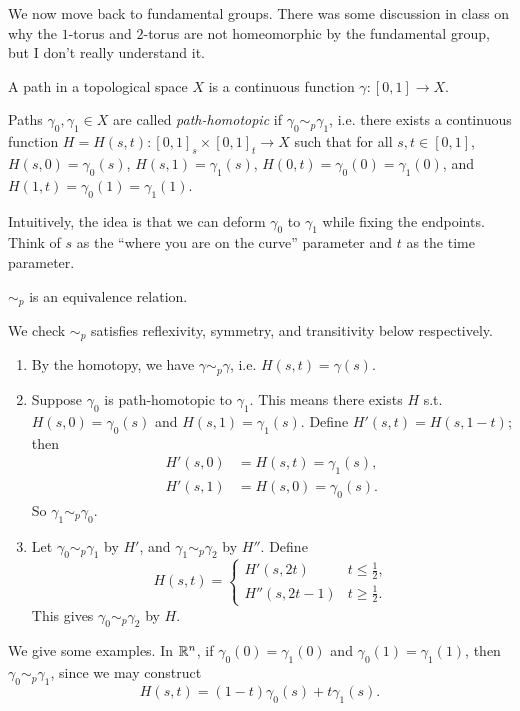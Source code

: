 \noindent We now move back to fundamental groups. There was some discussion in class on why the $1$-torus and $2$-torus are not homeomorphic by the fundamental group, but I don't really understand it.
\begin{definition}
    A path in a topological space $X$ is a continuous function $\gamma : [0, 1] \to X$.
\end{definition}
\begin{definition}
    Paths $\gamma_0, \gamma_1 \in X$ are called \textit{path-homotopic} if $\gamma_0 \sim_p \gamma_1$, i.e. there exists a continuous function $H = H(s, t) : [0, 1]_s \times [0, 1]_t \to X$ such that for all $s, t \in [0, 1]$, $H(s, 0) = \gamma_0(s)$, $H(s, 1) = \gamma_1(s)$, $H(0, t) = \gamma_0(0) = \gamma_1(0)$, and $H(1, t) = \gamma_0(1) = \gamma_1(1)$.
\end{definition}
\noindent Intuitively, the idea is that we can deform $\gamma_0$ to $\gamma_1$ while fixing the endpoints. Think of $s$ as the ``where you are on the curve'' parameter and $t$ as the time parameter.
\begin{simpleclaim}
    $\sim_p$ is an equivalence relation.
\end{simpleclaim}
\noindent We check $\sim_p$ satisfies reflexivity, symmetry, and transitivity below respectively.
\begin{enumerate}[label=(\alph*)]
    \item By the homotopy, we have $\gamma \sim_p \gamma$, i.e. $H(s, t) = \gamma(s)$.
    \item Suppose $\gamma_0$ is path-homotopic to $\gamma_1$. This means there exists $H$ s.t. $H(s, 0) = \gamma_0(s)$ and $H(s, 1) = \gamma_1(s)$. Define $H'(s, t) = H(s, 1-t)$; then
    \begin{align*}
        H'(s, 0) &= H(s, t) = \gamma_1(s), \\
        H'(s, 1) &= H(s, 0) = \gamma_0(s).
    \end{align*}
    So $\gamma_1 \sim_p \gamma_0$.
    \item Let $\gamma_0 \sim_p \gamma_1$ by $H'$, and $\gamma_1 \sim_p \gamma_2$ by $H''$. Define
    \[ H(s, t) = \begin{cases} H'(s, 2t) & t \leq \frac{1}{2}, \\ H''(s, 2t - 1) & t \geq \frac{1}{2}. \end{cases} \]
    This gives $\gamma_0 \sim_p \gamma_2$ by $H$.
\end{enumerate}
We give some examples. In $\mathbb R^n$, if $\gamma_0(0) = \gamma_1(0)$ and $\gamma_0(1) = \gamma_1(1)$, then $\gamma_0 \sim_p \gamma_1$, since we may construct
\[ H(s, t) = (1 - t) \gamma_0(s) + t \gamma_1(s). \]
 